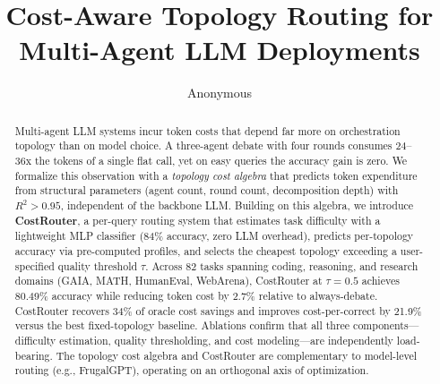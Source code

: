 \documentclass{article}
\title{Cost-Aware Topology Routing for Multi-Agent LLM Deployments}
\author{Anonymous}
\date{}
\begin{document}
\maketitle

\begin{abstract}
Multi-agent LLM systems incur token costs that depend far more on orchestration topology than on model choice. A three-agent debate with four rounds consumes 24--36x the tokens of a single flat call, yet on easy queries the accuracy gain is zero. We formalize this observation with a \emph{topology cost algebra} that predicts token expenditure from structural parameters (agent count, round count, decomposition depth) with $R^2 > 0.95$, independent of the backbone LLM. Building on this algebra, we introduce \textbf{CostRouter}, a per-query routing system that estimates task difficulty with a lightweight MLP classifier (84\% accuracy, zero LLM overhead), predicts per-topology accuracy via pre-computed profiles, and selects the cheapest topology exceeding a user-specified quality threshold $\tau$. Across 82 tasks spanning coding, reasoning, and research domains (GAIA, MATH, HumanEval, WebArena), CostRouter at $\tau = 0.5$ achieves 80.49\% accuracy while reducing token cost by 2.7\% relative to always-debate. CostRouter recovers 34\% of oracle cost savings and improves cost-per-correct by 21.9\% versus the best fixed-topology baseline. Ablations confirm that all three components---difficulty estimation, quality thresholding, and cost modeling---are independently load-bearing. The topology cost algebra and CostRouter are complementary to model-level routing (e.g., FrugalGPT), operating on an orthogonal axis of optimization.
\end{abstract}











\end{document}
